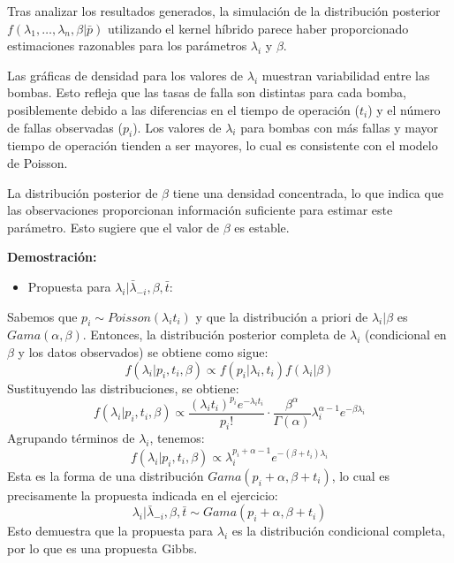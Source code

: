 Tras analizar los resultados generados, la simulación de la distribución posterior  $f(\lambda_1, \dots, \lambda_n, \beta | \bar{p})$  utilizando el kernel híbrido parece haber proporcionado estimaciones razonables para los parámetros $\lambda_i$ y $\beta$.

Las gráficas de densidad para los valores de $\lambda_i$ muestran variabilidad entre las bombas. Esto refleja que las tasas de falla son distintas para cada bomba, posiblemente debido a las diferencias en el tiempo de operación ($t_i$) y el número de fallas observadas ($p_i$). Los valores de $\lambda_i$ para bombas con más fallas y mayor tiempo de operación tienden a ser mayores, lo cual es consistente con el modelo de Poisson.

La distribución posterior de $\beta$ tiene una densidad concentrada, lo que indica que las observaciones proporcionan información suficiente para estimar este parámetro. Esto sugiere que el valor de $\beta$ es estable.

\textbf{Demostración:}

\begin{itemize}
	\item Propuesta para $\lambda_i | \bar{\lambda}_{-i}, \beta, \bar{t}$:
\end{itemize}
Sabemos que $p_i \sim Poisson(\lambda_i t_i)$ y que la distribución a priori de $\lambda_i | \beta$ es $Gama(\alpha, \beta)$. Entonces, la distribución posterior completa de $\lambda_i$ (condicional en $\beta$ y los datos observados) se obtiene como sigue:
\begin{equation}
	f(\lambda_i | p_i, t_i, \beta) \propto f(p_i | \lambda_i, t_i) f(\lambda_i | \beta)
\end{equation}
Sustituyendo las distribuciones, se obtiene:
\begin{equation}
f(\lambda_i | p_i, t_i, \beta) \propto \frac{(\lambda_i t_i)^{p_i} e^{-\lambda_i t_i}}{p_i!} \cdot \frac{\beta^\alpha}{\Gamma(\alpha)} \lambda_i^{\alpha - 1} e^{-\beta \lambda_i}
\end{equation}
Agrupando términos de $\lambda_i$, tenemos:
\begin{equation}
f(\lambda_i | p_i, t_i, \beta) \propto \lambda_i^{p_i + \alpha - 1} e^{-(\beta + t_i) \lambda_i}
\end{equation}
Esta es la forma de una distribución $Gama(p_i + \alpha, \beta + t_i)$, lo cual es precisamente la propuesta indicada en el ejercicio:
\begin{equation}
\lambda_i | \bar{\lambda}_{-i}, \beta, \bar{t} \sim Gama(p_i + \alpha, \beta + t_i)
\end{equation}
Esto demuestra que la propuesta para $\lambda_i$ es la distribución condicional completa, por lo que es una propuesta Gibbs.

